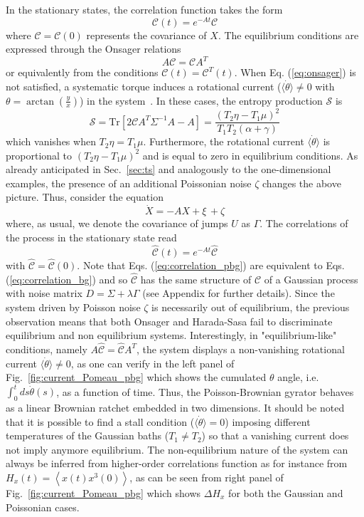 \documentclass[12pt]{iopart}
\newcommand{\lx} {\left}
\newcommand{\rx} {\right}
\newcommand{\ave}[1] {\lx\langle #1 \rx\rangle}
\newcommand{\cS} {\mathcal{S}}
\newcommand{\cC} {\mathcal{C}}
\begin{document}
In the stationary states, the correlation function takes the form 
\begin{equation}
    \cC(t)=e^{-At}\cC
    \label{eq:correlation_bg}
\end{equation}
where $\cC=\cC(0)$ represents the covariance of $X$. The equilibrium conditions are expressed through the Onsager relations
\begin{equation}
    A\cC=\cC A^T
\label{eq:onsager}
\end{equation}
or equivalently from the conditions $\cC(t)=\cC^T(t)$. When Eq. (\ref{eq:onsager}) is not satisfied, a systematic torque induces a rotational current ($\langle\dot{\theta}\rangle\neq 0$ with $\theta=\arctan\lx(\frac{y}{x}\rx)$) in the system~\cite{baldassarri2020engineered,crisanti2012nonequilibrium}. In these cases, the entropy production $\cS$ is
\begin{equation}
    \cS=\text{Tr}\lx[2 \cC A^T \Sigma^{-1}A - A \rx]=\frac{\lx(T_2\eta-T_1\mu\rx)^2}{T_1T_2(\alpha+\gamma)}
    \label{eq:epr_bg}
\end{equation}
which vanishes when $T_2\eta=T_1\mu$. Furthermore, the rotational current $\langle\dot{\theta}\rangle$ is proportional to  $\lx(T_2\eta-T_1\mu\rx)^2$ and is equal to zero in equilibrium conditions. As already anticipated in Sec.~\ref{sec:ts} and analogously to the one-dimensional examples, the presence of an additional Poissonian noise $\zeta$ changes the above picture. Thus, consider the equation
\begin{equation}
    \dot{X}=-AX+\xi\,+\zeta
\end{equation}
where, as usual, we denote the covariance of jumps $U$ as $\Gamma$. The correlations of the process in the stationary state read
\begin{equation}
\hat{\cC}(t)=e^{-At}\hat{\cC}
\label{eq:correlation_pbg}
\end{equation}
with $\hat{\cC}=\hat{\cC}(0)$. Note that Eqs. (\ref{eq:correlation_pbg}) are equivalent to Eqs. (\ref{eq:correlation_bg}) and so $\hat{\cC}$ has the same structure of $\cC$ of a Gaussian process with noise matrix $D=\Sigma+\lambda\Gamma$ (see Appendix for further details). Since the system driven by Poisson noise $\zeta$ is necessarily out of equilibrium, the previous observation means that both Onsager and Harada-Sasa fail to discriminate equilibrium and non equilibrium systems. Interestingly, in "equilibrium-like" conditions, namely $A\hat{\cC}=\hat{\cC} A^T$, the system displays a non-vanishing rotational current $\langle \dot{\theta}\rangle\neq 0$, as one can verify in the left panel of Fig.~\ref{fig:current_Pomeau_pbg} which shows the cumulated $\theta$ angle, i.e. $\int_0^t ds \dot\theta(s)$, as a function of time. Thus, the Poisson-Brownian gyrator behaves as a linear Brownian ratchet embedded in two dimensions. It should be noted that it is possible to find a stall condition ($\langle \dot{\theta} \rangle=0$) imposing different temperatures of the Gaussian baths ($T_1\neq T_2$) so that a vanishing current does not imply anymore equilibrium. The non-equilibrium nature of the system can always be inferred from higher-order correlations function as for instance from $H_x(t)=\ave{x(t)x^3(0)}$, as can be seen from right panel of Fig.~\ref{fig:current_Pomeau_pbg} which shows $\Delta H_x$ for both the Gaussian and Poissonian cases.  
\end{document}
